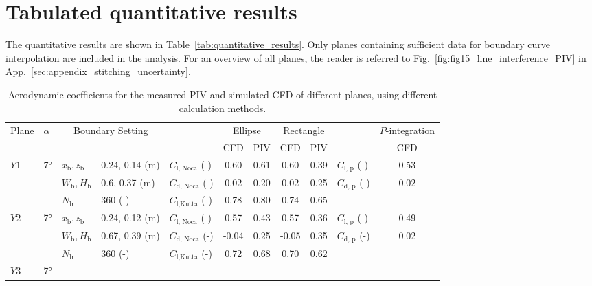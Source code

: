 \documentclass[wes, manuscript]{copernicus}
\begin{document}
\section{Tabulated quantitative results}\label{sec:tabulated_quantitative_results}
%
The quantitative results are shown in Table~\ref{tab:quantitative_results}.
Only planes containing sufficient data for boundary curve interpolation are included in the analysis. 
For an overview of all planes, the reader is referred to Fig.~\ref{fig:fig15_line_interference_PIV} in App.~\ref{sec:appendix_stitching_uncertainty}.
%
\begin{table}[H]
    \centering
    \caption{Aerodynamic coefficients for the measured PIV and simulated CFD of different planes, using different calculation methods.}
    \begin{tabular}{p{0.5cm} p{0.8cm} p{.8cm} p{2.6cm} p{1.8cm} c c c p{1cm} p{1.3cm} c} %
    \hline
    \multirow{2}{*}{Plane} & \multirow{2}{*}{$\alpha$} & \multicolumn{2}{c}{\multirow{2}{*}{Boundary Setting}} & \multirow{2}{*}{} & \multicolumn{2}{c}{Ellipse} & \multicolumn{2}{c}{Rectangle} &  & $P$-integration \\
    & & & & & CFD & PIV & CFD & PIV & & CFD \\
    \hline
    \multirow{3}{*}{$Y1$} & \multirow{3}{*}{7\unit{\degree}}
    & $x_{\textrm{b}},z_{\textrm{b}}$ & 0.24, 0.14 (\unit{m}) & $C_{\textrm{l, Noca}}$ (\unit{-}) & 0.60 & 0.61 & 0.60 & 0.39 & $C_{\textrm{l, p}}$ (\unit{-})& 0.53 \\
    & & $W_{\textrm{b}}, H_{\textrm{b}}$ & 0.6, 0.37 (\unit{m}) & $C_{\textrm{d, Noca}}$ (\unit{-})& 0.02 & 0.20 & 0.02 & 0.25 & $C_{\textrm{d, p}}$ (\unit{-})& 0.02 \\
    & & $N_{\textrm{b}}$ & 360 (\unit{-}) & $C_{\textrm{l,Kutta}}$ (\unit{-})& 0.78 & 0.80 & 0.74 & 0.65 & & \\
    \hline
    \multirow{3}{*}{$Y2$} & \multirow{3}{*}{7\unit{\degree}}
    & $x_{\textrm{b}},z_{\textrm{b}}$ & 0.24, 0.12 (\unit{m}) & $C_{\textrm{l, Noca}}$ (\unit{-})& 0.57 & 0.43 & 0.57 & 0.36 & $C_{\textrm{l, p}}$ (\unit{-})& 0.49 \\
    & & $W_{\textrm{b}}, H_{\textrm{b}}$ & 0.67, 0.39 (\unit{m}) & $C_{\textrm{d, Noca}}$ (\unit{-})& -0.04 & 0.25 & -0.05 & 0.35 & $C_{\textrm{d, p}}$ (\unit{-})& 0.02 \\
    & & $N_{\textrm{b}}$ & 360 (\unit{-}) & $C_{\textrm{l,Kutta}}$ (\unit{-})& 0.72 & 0.68 & 0.70 & 0.62 & & \\
    \hline
    \multirow{3}{*}{$Y3$} & \multirow{3}{*}{7\unit{\degree}}

\end{tabular}
\end{table}
\end{document}
